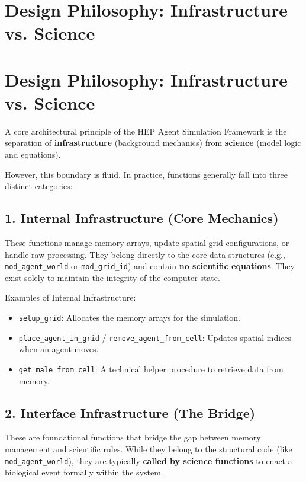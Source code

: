 \section{Design Philosophy: Infrastructure vs. Science}

\section{Design Philosophy: Infrastructure vs. Science}

A core architectural principle of the HEP Agent Simulation Framework is the separation of \textbf{infrastructure} (background mechanics) from \textbf{science} (model logic and equations). 

However, this boundary is fluid. In practice, functions generally fall into three distinct categories:

\subsection{1. Internal Infrastructure (Core Mechanics)}
These functions manage memory arrays, update spatial grid configurations, or handle raw processing. They belong directly to the core data structures (e.g., \texttt{mod\_agent\_world} or \texttt{mod\_grid\_id}) and contain \textbf{no scientific equations}. They exist solely to maintain the integrity of the computer state.

Examples of Internal Infrastructure:
\begin{itemize}
    \item \texttt{setup\_grid}: Allocates the memory arrays for the simulation.
    \item \texttt{place\_agent\_in\_grid} / \texttt{remove\_agent\_from\_cell}: Updates spatial indices when an agent moves.
    \item \texttt{get\_male\_from\_cell}: A technical helper procedure to retrieve data from memory.
\end{itemize}

\subsection{2. Interface Infrastructure (The Bridge)}
These are foundational functions that bridge the gap between memory management and scientific rules. While they belong to the structural code (like \texttt{mod\_agent\_world}), they are typically \textbf{called by science functions} to enact a biological event formally within the system.

